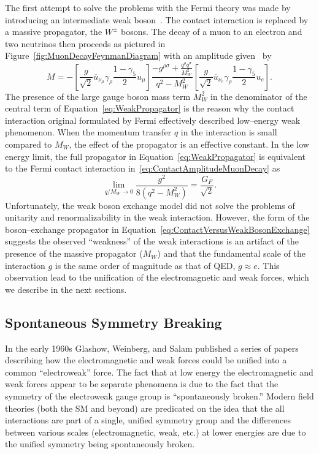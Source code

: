 The first attempt to solve the problems with the Fermi theory was made by
introducing an intermediate weak boson~\cite{Glashow:1961tr}.  The contact
interaction is replaced by a massive propagator, the $W^\pm$ bosons.  The decay
of a muon to an electron and two neutrinos then proceeds as pictured in
Figure~\ref{fig:MuonDecayFeynmanDiagram} with an amplitude
given~\cite{Morii:SMandBSM} by
\begin{equation}
  M = - \left[\frac{g}{\sqrt{2}} \overline u_{\nu_\mu} \gamma_\rho \frac{1 -
  \gamma_5}{2} u_\mu\right] \frac{-g^{\rho\sigma} + \frac{q^\rho
  q^\sigma}{M_W^2}}{q^2 - M_W^2} 
  \left[\frac{g}{\sqrt{2}} \overline u_{\nu_e} \gamma_\rho \frac{1 -
  \gamma_5}{2} u_e\right].
  \label{eq:WeakPropagator}
\end{equation}
The presence of the large gauge boson mass term $M_W^2$ in the denominator of
the central term of Equation~\ref{eq:WeakPropagator} is the reason why the
contact interaction original formulated by Fermi effectively described 
low--energy weak phenomenon.  When the momentum transfer $q$ in the interaction
is small compared to $M_W$, the effect of the propagator is an effective
constant.  In the low energy limit, the full propagator in
Equation~\ref{eq:WeakPropagator} is equivalent to the Fermi contact
interaction in~\ref{eq:ContactAmplitudeMuonDecay} as
\begin{equation}
  \lim_{q/M_W \to 0}\frac{g^2}{8(q^2-M^2_W)} = \frac{G_F}{\sqrt{2}}.
  \label{eq:ContactVersusWeakBosonExchange}
\end{equation}
Unfortunately, the weak boson exchange model did not solve the problems of
unitarity and renormalizability in the weak interaction.   However, the form of
the boson--exchange propagator in
Equation~\ref{eq:ContactVersusWeakBosonExchange} suggests the observed
``weakness'' of the weak interactions is an artifact of the presence of the
massive propagator ($M_W$) and that the fundamental scale of the interaction $g$
is the same order of magnitude as that of QED, $g \approx e$.  This observation
lead to the unification of the electromagnetic and weak forces, which we
describe in the next sections.

\subsection{Spontaneous Symmetry Breaking}
\label{sec:SSB}
In the early 1960s Glashow, Weinberg, and Salam published a series of papers
describing how the electromagnetic and weak forces could be unified into a
common ``electroweak'' force.  The fact that at low energy the electromagnetic
and weak forces appear to be separate phenomena is due to the fact that the
symmetry of the electroweak gauge group is ``spontaneously broken.''  Modern
field theories (both the SM and beyond) are predicated on the idea
that the all interactions are part of a single, unified symmetry group and the 
differences between various scales (electromagnetic, weak, etc.) at lower
energies are due to the unified symmetry being spontaneously broken.

